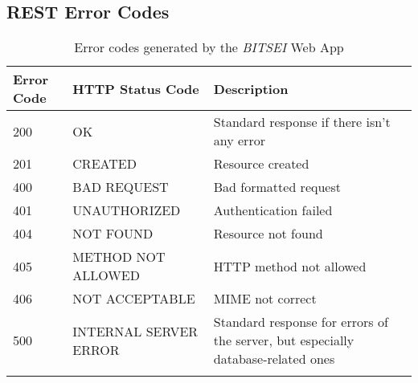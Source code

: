 \subsection{REST Error Codes}


\begin{longtable}{|p{}|p{} |p{}|} 
\hline
\textbf{Error Code} & \textbf{HTTP Status Code} & \textbf{Description} \\\hline
200  & OK & Standard response if there isn't any error \\\hline
201  & CREATED & Resource created \\\hline
400  & BAD REQUEST & Bad formatted request\\\hline
401  & UNAUTHORIZED & Authentication failed\\\hline
404  & NOT FOUND &  Resource not found\\\hline
405  & METHOD NOT ALLOWED &  HTTP method not allowed \\\hline
406  & NOT ACCEPTABLE &  MIME not correct \\\hline
500  & INTERNAL SERVER ERROR &  Standard response for errors of the server, but especially database-related ones \\\hline
\caption{Error codes generated by the \textit{BITSEI} Web App}
\label{tab:errorcodes}
\end{longtable}